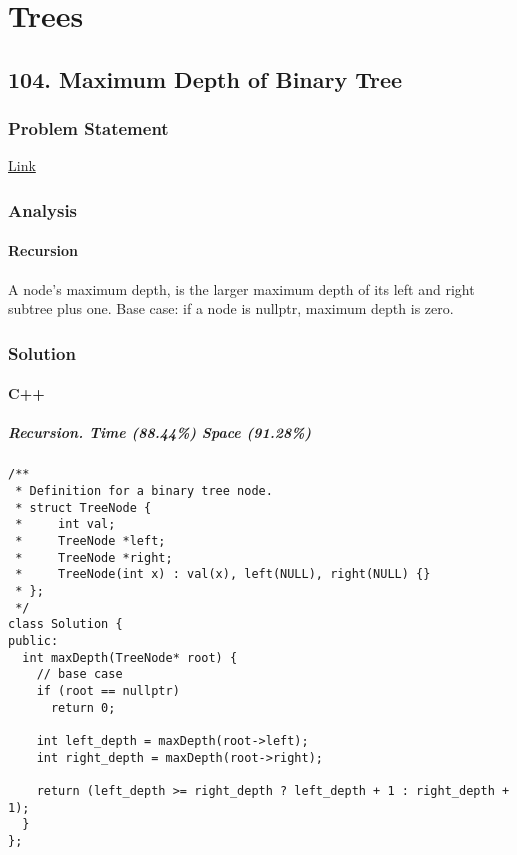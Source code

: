 \documentclass[12pt]{book}
\begin{document}
\part{Trees}
\label{sec:orgad9797b}
\chapter{104. Maximum Depth of Binary Tree}
\label{sec:org046c395}
\section{Problem Statement}
\label{sec:org599a3cc}
\href{https://leetcode.com/problems/maximum-depth-of-binary-tree/}{Link}
\section{Analysis}
\label{sec:orgc352fa7}
\subsection{Recursion}
\label{sec:orgada5fcc}
A node's maximum depth, is the larger maximum depth of its left and right subtree plus one. Base case: if a node is nullptr, maximum depth is zero.
\section{Solution}
\label{sec:orgb2ad9d8}
\subsection{C++}
\label{sec:orge890e5c}
\subsubsection{Recursion. Time (88.44\%) Space (91.28\%)}
\label{sec:org52bb576}
\begin{verbatim}
/**
 * Definition for a binary tree node.
 * struct TreeNode {
 *     int val;
 *     TreeNode *left;
 *     TreeNode *right;
 *     TreeNode(int x) : val(x), left(NULL), right(NULL) {}
 * };
 */
class Solution {
public:
  int maxDepth(TreeNode* root) {
    // base case 
    if (root == nullptr)
      return 0;

    int left_depth = maxDepth(root->left);
    int right_depth = maxDepth(root->right);

    return (left_depth >= right_depth ? left_depth + 1 : right_depth + 1);
  }
};
\end{verbatim}
\end{document}
